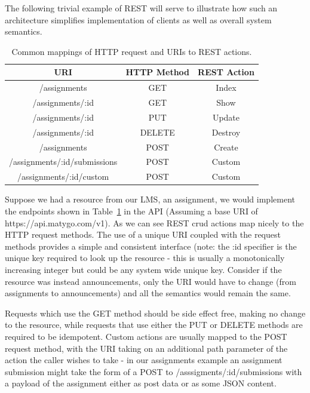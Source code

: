 \documentclass[a4paper,12pt,titlepage]{report}
\begin{document}
The following trivial example of REST will serve to illustrate how such an architecture simplifies implementation of clients as well as overall system semantics.

\begin{table}
\begin{center}
\begin{tabular}{ | c | c | c | }
\hline
URI & HTTP Method & REST Action \\ \hline
/assignments & GET & Index \\ \hline
/assignments/:id & GET & Show \\ \hline
/assignments/:id & PUT & Update \\ \hline
/assignments/:id & DELETE & Destroy \\ \hline
/assignments & POST & Create \\ \hline
/assignments/:id/submissions & POST & Custom \\ \hline
/assignments/:id/custom & POST & Custom \\ \hline
\end{tabular}
\end{center}
\caption{Common mappings of HTTP request and URIs to REST actions.}
\label{tab:rest_actions}
\end{table}


Suppose we had a resource from our LMS, an assignment, we would implement the  endpoints shown in Table~\ref{tab:rest_actions} in the API (Assuming a base URI of https://api.matygo.com/v1).
As we can see REST crud actions map nicely to the HTTP request methods.
The use of a unique URI coupled with the request methods provides a simple and consistent interface (note: the :id specifier is the unique key required to look up the resource - this is usually a monotonically increasing integer but could be any system wide unique key.
Consider if the resource was instead announcements, only the URI would have to change (from assignments to announcements) and all the semantics would remain the same.

Requests which use the GET method should be side effect free, making no change to the resource, while requests that use either the PUT or DELETE methods are required to be idempotent.
Custom actions are usually mapped to the POST request method, with the URI taking on an additional path parameter of the action the caller wishes to take - in our assignments example an assignment submission might take the form of a POST to /asssigments/:id/submissions with a payload of the assignment either as post data or as some JSON content. 
\end{document}

